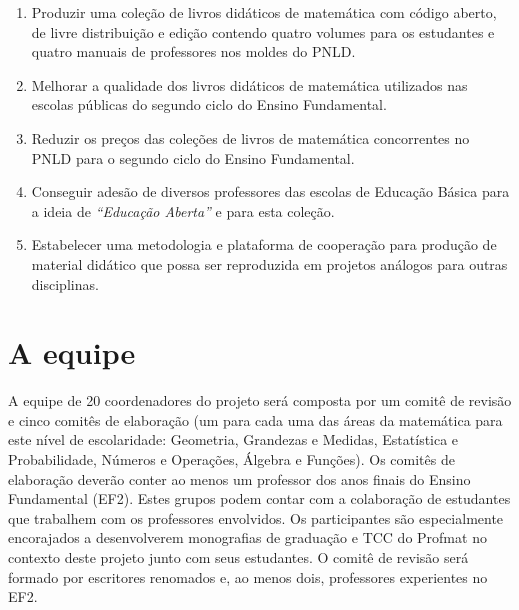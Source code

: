 \documentclass[10 pt]{article}
\begin{document}
\begin{enumerate}
\item Produzir uma coleção de livros didáticos de matemática com código aberto, de livre distribuição e edição contendo quatro volumes para os estudantes e quatro manuais de professores nos moldes do PNLD.
\item Melhorar a qualidade dos livros didáticos de matemática utilizados nas escolas públicas do segundo ciclo do Ensino Fundamental.
\item Reduzir os preços das coleções de livros de matemática concorrentes no PNLD para o segundo ciclo do Ensino Fundamental.
\item Conseguir adesão de diversos professores das escolas de Educação Básica para a ideia de {\it ``Educação Aberta''} e para esta coleção.
\item Estabelecer uma metodologia e plataforma de cooperação para produção de material didático que possa ser reproduzida em projetos análogos para outras disciplinas.
\end{enumerate}

%

 \section{A equipe}\label{equipe}

A equipe de 20 coordenadores do projeto será composta por um comitê de revisão e cinco comitês de elaboração (um para cada uma das áreas da matemática para este nível de escolaridade: Geometria, Grandezas e Medidas, Estatística e Probabilidade, Números e Operações, Álgebra e Funções).
Os comitês de elaboração deverão conter ao menos um professor dos anos finais do Ensino Fundamental (EF2).
Estes grupos podem contar com a colaboração de estudantes que trabalhem com os professores envolvidos.
Os participantes são especialmente encorajados a desenvolverem monografias de graduação e TCC do Profmat no contexto deste projeto junto com seus estudantes. %
O comitê de revisão será formado por escritores renomados e, ao menos dois, professores experientes no EF2.
\end{document}
